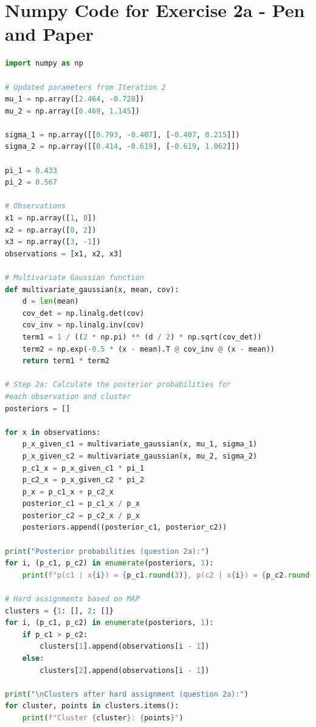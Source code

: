 \documentclass[12pt]{article}
\begin{document}
\section{Numpy Code for Exercise 2a - Pen and Paper}
\begin{lstlisting}[language=Python, caption=Python code for Exercise 2a]
import numpy as np

# Updated parameters from Iteration 2
mu_1 = np.array([2.464, -0.728])
mu_2 = np.array([0.469, 1.145])

sigma_1 = np.array([[0.793, -0.407], [-0.407, 0.215]])
sigma_2 = np.array([[0.414, -0.619], [-0.619, 1.062]])

pi_1 = 0.433
pi_2 = 0.567

# Observations
x1 = np.array([1, 0])
x2 = np.array([0, 2])
x3 = np.array([3, -1])
observations = [x1, x2, x3]

# Multivariate Gaussian function
def multivariate_gaussian(x, mean, cov):
    d = len(mean)
    cov_det = np.linalg.det(cov)
    cov_inv = np.linalg.inv(cov)
    term1 = 1 / ((2 * np.pi) ** (d / 2) * np.sqrt(cov_det))
    term2 = np.exp(-0.5 * (x - mean).T @ cov_inv @ (x - mean))
    return term1 * term2

# Step 2a: Calculate the posterior probabilities for 
#each observation and cluster
posteriors = []

for x in observations:
    p_x_given_c1 = multivariate_gaussian(x, mu_1, sigma_1)
    p_x_given_c2 = multivariate_gaussian(x, mu_2, sigma_2)
    p_c1_x = p_x_given_c1 * pi_1
    p_c2_x = p_x_given_c2 * pi_2
    p_x = p_c1_x + p_c2_x
    posterior_c1 = p_c1_x / p_x
    posterior_c2 = p_c2_x / p_x
    posteriors.append((posterior_c1, posterior_c2))

print("Posterior probabilities (question 2a):")
for i, (p_c1, p_c2) in enumerate(posteriors, 1):
    print(f"p(c1 | x{i}) = {p_c1.round(3)}, p(c2 | x{i}) = {p_c2.round(3)}")

# Hard assignments based on MAP
clusters = {1: [], 2: []}
for i, (p_c1, p_c2) in enumerate(posteriors, 1):
    if p_c1 > p_c2:
        clusters[1].append(observations[i - 1])
    else:
        clusters[2].append(observations[i - 1])

print("\nClusters after hard assignment (question 2a):")
for cluster, points in clusters.items():
    print(f"Cluster {cluster}: {points}")
\end{lstlisting}
\end{document}
